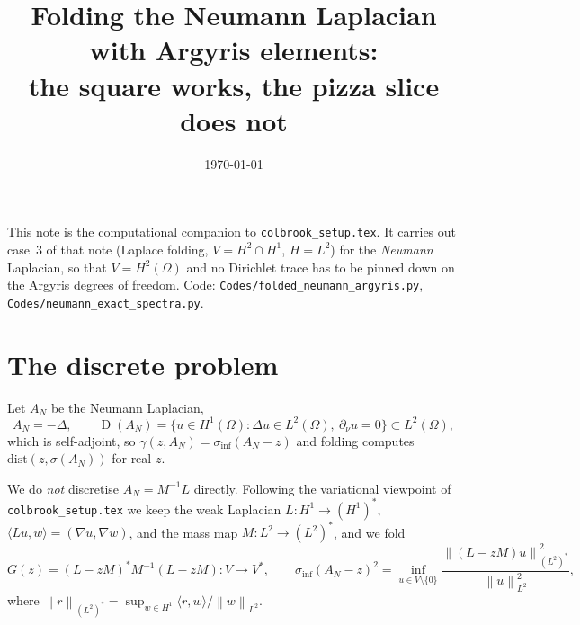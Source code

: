 \documentclass[11pt,a4paper]{article}
\title{Folding the Neumann Laplacian with Argyris elements:\\
       the square works, the pizza slice does not}
\date{\today}
\newcommand{\norm}[1]{\left\|#1\right\|}
\DeclareMathOperator{\dom}{D}
\newcommand{\siginf}{\sigma_{\inf}}
\begin{document}
\maketitle

This note is the computational companion to \texttt{colbrook\_setup.tex}. It
carries out case~3 of that note (Laplace folding, $V = H^2\cap H^1$, $H = L^2$)
for the \emph{Neumann} Laplacian, so that $V = H^2(\Omega)$ and no Dirichlet
trace has to be pinned down on the Argyris degrees of freedom. Code:
\texttt{Codes/folded\_neumann\_argyris.py}, \texttt{Codes/neumann\_exact\_spectra.py}.

\section{The discrete problem}

Let $A_N$ be the Neumann Laplacian,
\begin{equation}
  A_N = -\Delta, \qquad
  \dom(A_N) = \{u \in H^1(\Omega) : \Delta u \in L^2(\Omega),\ \partial_\nu u = 0\}
  \subset L^2(\Omega),
\end{equation}
which is self-adjoint, so $\gamma(z,A_N) = \siginf(A_N - z)$ and folding
computes $\mathrm{dist}(z,\sigma(A_N))$ for real $z$.

We do \emph{not} discretise $A_N = M^{-1}L$ directly. Following the variational
viewpoint of \texttt{colbrook\_setup.tex} we keep the weak Laplacian
$L\colon H^1 \to (H^1)^*$, $\langle Lu,w\rangle = (\nabla u,\nabla w)$, and the
mass map $M\colon L^2 \to (L^2)^*$, and we fold
\begin{equation}
  G(z) = (L-zM)^* M^{-1} (L-zM) : V \to V^*,
  \qquad
  \siginf(A_N-z)^2 = \inf_{u \in V\setminus\{0\}}
     \frac{\norm{(L-zM)u}_{(L^2)^*}^2}{\norm{u}_{L^2}^2},
\end{equation}
where $\norm{r}_{(L^2)^*} = \sup_{w \in H^1} \langle r,w\rangle / \norm{w}_{L^2}$.
\end{document}
